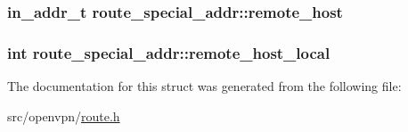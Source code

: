 \subsubsection[{remote\+\_\+host}]{\setlength{\rightskip}{0pt plus 5cm}in\+\_\+addr\+\_\+t route\+\_\+special\+\_\+addr\+::remote\+\_\+host}\label{structroute__special__addr_a38a9460b7b2499bb5fd58215639ae59d}
\hypertarget{structroute__special__addr_af88e550cc124331aafbdc4322db7fce0}{}
\subsubsection[{remote\+\_\+host\+\_\+local}]{\setlength{\rightskip}{0pt plus 5cm}int route\+\_\+special\+\_\+addr\+::remote\+\_\+host\+\_\+local}\label{structroute__special__addr_af88e550cc124331aafbdc4322db7fce0}


The documentation for this struct was generated from the following file\+:\begin{DoxyCompactItemize}
\item 
src/openvpn/\hyperlink{route_8h}{route.\+h}\end{DoxyCompactItemize}
